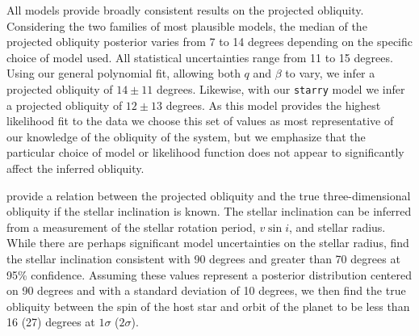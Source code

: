 \documentclass[twocolumn]{aastex63}
\newcommand{\vsini}{{$v \sin i$}}
\begin{document}
All models provide broadly consistent results on the projected obliquity. Considering the two families of most plausible models, the median of the projected obliquity posterior varies from 7 to 14 degrees depending on the specific choice of model used.
All statistical uncertainties range from 11 to 15 degrees.
Using our general polynomial fit, allowing both $q$ and $\beta$ to vary, we infer a projected obliquity of $14 \pm 11$ degrees.
Likewise, with our \texttt{starry} model we infer a projected obliquity of $12 \pm 13$ degrees.
As this model provides the highest likelihood fit to the data we choose this set of values as most representative of our knowledge of the obliquity of the system, but we emphasize that the particular choice of model or likelihood function does not appear to significantly affect the inferred obliquity. 

\citet{Cegla16} provide a relation between the projected obliquity and the true three-dimensional obliquity if the stellar inclination is known. 
The stellar inclination can be inferred from a measurement of the stellar rotation period, \vsini, and stellar radius. 
While there are perhaps significant model uncertainties on the stellar radius, \citet{Newton19} find the stellar inclination consistent with 90 degrees and greater than 70 degrees at 95\% confidence. Assuming these values represent a posterior distribution centered on 90 degrees and with a standard deviation of 10 degrees, we then find the true obliquity between the spin of the host star and orbit of the planet to be less than 16 (27) degrees at $1\sigma$ ($2\sigma$).
\end{document}
